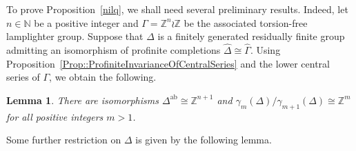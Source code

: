 \documentclass{amsart}
\numberwithin{theorem}{section}
\numberwithin{equation}{section}
\newtheorem{lemma}[theorem]{Lemma}
\newcommand{\Z}{\mathbb{Z}}
\begin{document}
To prove Proposition~\ref{nilq}, we shall need several preliminary results. Indeed, let $n \in \mathbb{N}$ be a positive integer and $\Gamma = \Z^n \wr \Z$ be the associated torsion-free lamplighter group. Suppose that $\Delta$ is a finitely generated residually finite group admitting an isomorphism of profinite completions $\widehat{\Delta} \cong \widehat{\Gamma}$. Using Proposition~\ref{Prop::ProfiniteInvarianceOfCentralSeries} and the lower central series of $\Gamma$, we obtain the following.

\begin{lemma}\label{Lem::CentralSeries}
    There are isomorphisms $\Delta^\mathrm{ab} \cong \Z^{n+1}$ and $\gamma_m(\Delta)/\gamma_{m+1}(\Delta) \cong \mathbb Z^{m}$ for all positive integers $m > 1$. 
\end{lemma} 

Some further restriction on $\Delta$ is given by the following lemma.
\end{document}

